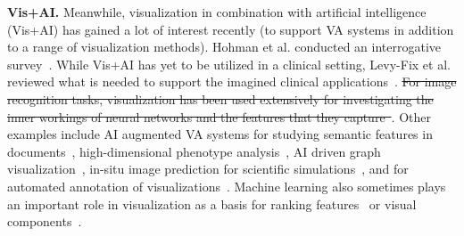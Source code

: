 

\vspace{1pt}
\noindent\textbf{Vis+AI.} Meanwhile, visualization in combination with artificial intelligence (Vis+AI) has gained a lot of interest recently (to support VA systems in addition to a range of visualization methods). Hohman et al. conducted an interrogative survey~\cite{8371286}.
While Vis+AI has yet to be utilized in a clinical setting, Levy-Fix et al. reviewed what is needed to support the imagined clinical applications~\cite{levy2019machine}. \sout{For image recognition tasks, visualization has been used extensively for investigating the inner workings of neural networks and the features that they capture~\cite{olah2017feature, 8022871, 8017583, 8827593}}. Other examples include AI augmented VA systems for studying semantic features in documents~\cite{ji2019visual},  high-dimensional phenotype analysis~\cite{8827951}, AI driven graph visualization~\cite{8017580,8805452}, in-situ image prediction for scientific simulations~\cite{he2019insitunet}, and for automated annotation of visualizations~\cite{lai2020automatic}. Machine learning also sometimes plays an important role in visualization as a basis for ranking features~\cite{mumtaz2015visualisation,maniyar2006data} or visual components~\cite{10.1145/3126594.3126653}.




